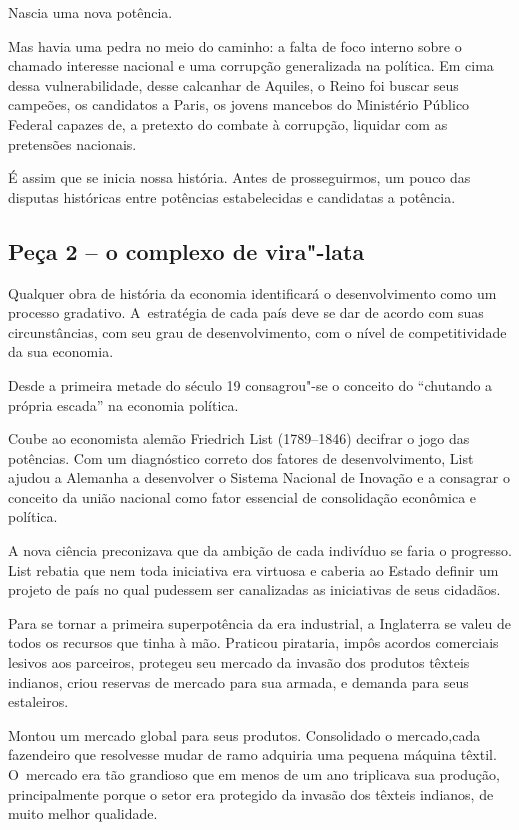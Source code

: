 Nascia uma nova potência.

Mas havia uma pedra no meio do caminho: a falta de foco interno sobre o
chamado interesse nacional e uma corrupção generalizada na política. Em
cima dessa vulnerabilidade, desse calcanhar de Aquiles, o Reino foi
buscar seus campeões, os candidatos a Paris, os jovens mancebos do
Ministério Público Federal capazes de, a pretexto do combate à
corrupção, liquidar com as pretensões nacionais.

É assim que se inicia nossa história. Antes de prosseguirmos, um pouco
das disputas históricas entre potências estabelecidas e candidatas a
potência.

\subsection{Peça 2 -- o complexo de vira"-lata}

Qualquer obra de história da economia identificará o desenvolvimento
como um processo gradativo. A~estratégia de cada país deve se dar de
acordo com suas circunstâncias, com seu grau de desenvolvimento, com o
nível de competitividade da sua economia.

Desde a primeira metade do século 19 consagrou"-se o conceito do
``chutando a própria escada'' na economia política.

Coube ao economista alemão Friedrich List (1789--1846) decifrar o jogo
das potências. Com um diagnóstico correto dos fatores de
desenvolvimento, List ajudou a Alemanha a desenvolver o Sistema Nacional
de Inovação e a consagrar o conceito da união nacional como fator
essencial de consolidação econômica e política.

A nova ciência preconizava que da ambição de cada indivíduo se faria o
progresso. List rebatia que nem toda iniciativa era virtuosa e caberia
ao Estado definir um projeto de país no qual pudessem ser canalizadas as
iniciativas de seus cidadãos.

Para se tornar a primeira superpotência da era industrial, a Inglaterra
se valeu de todos os recursos que tinha à mão. Praticou pirataria, impôs
acordos comerciais lesivos aos parceiros, protegeu seu mercado da
invasão dos produtos têxteis indianos, criou reservas de mercado para
sua armada, e demanda para seus estaleiros.

Montou um mercado global para seus produtos. Consolidado o mercado,cada
fazendeiro que resolvesse mudar de ramo adquiria uma pequena máquina
têxtil. O~mercado era tão grandioso que em menos de um ano triplicava
sua produção, principalmente porque o setor era protegido da invasão dos
têxteis indianos, de muito melhor qualidade.


